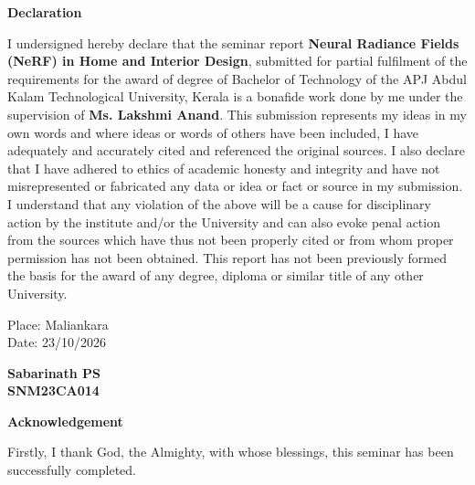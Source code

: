 \documentclass[12pt,a4paper,final]{extreport}
\begin{document}
\newpage

\thispagestyle{empty}
\begin{center}
\begin{huge}
\textbf{Declaration}
\end{huge}
\end{center}

\vskip0.5cm
I undersigned hereby declare that the seminar report \textbf{Neural Radiance Fields (NeRF) in Home and Interior Design}, submitted for partial fulfilment of the requirements for the award of degree of Bachelor of Technology of the APJ Abdul Kalam Technological University, Kerala is a bonafide work done by me under the supervision of \textbf{Ms. Lakshmi Anand}. This submission represents my ideas in my own words and where ideas or words of others have been included, I have adequately and accurately cited and referenced the original sources. I also declare that I have adhered to ethics of academic honesty and integrity and have not misrepresented or fabricated any data or idea or fact or source in my submission. I understand that any violation of the above will be a cause for disciplinary action by the institute and/or the University and can also evoke penal action from the sources which have thus not been properly cited or from whom proper permission has not been obtained. This report has not been previously formed the basis for the award of any degree, diploma or similar title of any other University.

\vspace{2cm}
\noindent
\begin{minipage}[t]{0.5\textwidth}
Place: Maliankara\\
Date: 23/10/2026
\end{minipage}%
\hfill
\begin{minipage}[t]{0.4\textwidth}
\centering
\textbf{Sabarinath PS}\\
\textbf{SNM23CA014}
\end{minipage}

\newpage
\thispagestyle{plain}
\setcounter{page}{1}
\begin{center}
\begin{huge}
\textbf{Acknowledgement}
\end{huge}
\end{center}
\vskip1cm
\hspace*{1 cm} Firstly, I thank God, the Almighty, with whose blessings, this seminar has been successfully completed.
\end{document}

